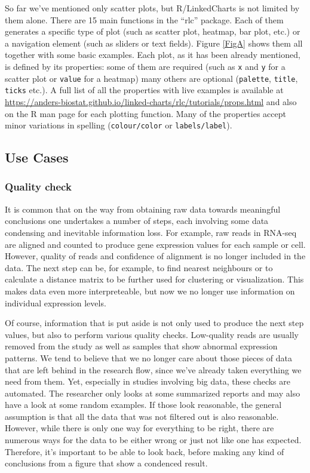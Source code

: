 \documentclass[twocolumn,10pt]{article}
\begin{document}
So far we've mentioned only scatter plots, but R/LinkedCharts is not limited by them alone. There are 15 main functions in the ``rlc'' package. Each of them generates a specific type of plot (such as scatter plot, heatmap, bar plot, etc.) or a navigation element (such as sliders or text fields). Figure \ref{FigA} shows them all together with some basic examples. Each plot, as it has been already mentioned, is defined by its properties: some of them are required (such as \texttt{x} and \texttt{y} for a scatter plot or \texttt{value} for a heatmap) many others are optional (\texttt{palette}, \texttt{title}, \texttt{ticks} etc.). A full list of all the properties with live examples is available at \url{https://anders-biostat.github.io/linked-charts/rlc/tutorials/props.html} and also on the R man page for each plotting function. Many of the properties accept minor variations in spelling (\texttt{colour/color} or \texttt{labels/label}).

\subsection{Use Cases}
\subsubsection{Quality check}

It is common that on the way from obtaining raw data towards meaningful conclusions one undertakes a number of steps, each involving some data condensing and inevitable information loss. For example, raw reads in RNA-seq are aligned and counted to produce gene expression values for each sample or cell. However, quality of reads and confidence of alignment is no longer included in the data. The next step can be, for example, to find nearest neighbours or to calculate a distance matrix to be further used for clustering or visualization. This makes data even more interpreteable, but now we no longer use information on individual expression levels. 

Of course, information that is put aside is not only used to produce the next step values, but also to perform various quality checks. Low-quality reads are usually removed from the study as well as samples that show abnormal expression patterns. We tend to believe that we no longer care about those pieces of data that are left behind in the research flow, since we've already taken everything we need from them. Yet, especially in studies involving big data, these checks are automated. The researcher only looks at some summarized reports and may also have a look at some random examples. If those look reasonable, the general assumption is that all the data that was not filtered out is also reasonable. However, while there is only one way for everything to be right, there are numerous ways for the data to be either wrong or just not like one has expected. Therefore, it's important to be able to look back, before making any kind of conclusions from a figure that show a condenced result.
\end{document}
